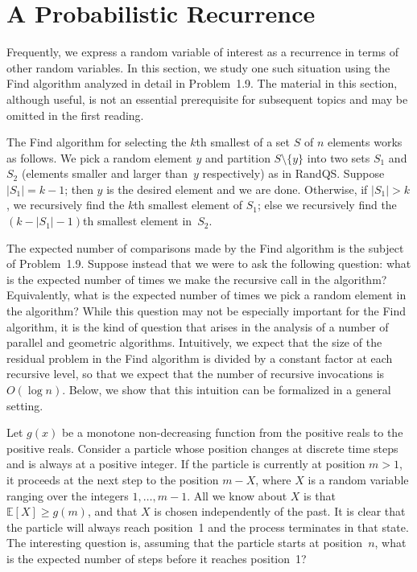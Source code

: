 \documentclass[twoside,12pt]{book}
\theoremstyle{plain}
\theoremstyle{definition}
\theoremstyle{remark}
\begin{document}
\section{A Probabilistic Recurrence}
\label{sec:recurrence}

Frequently, we express a random variable of interest as a recurrence in
terms of other random variables.  In this section, we study one such
situation using the Find algorithm analyzed in detail in Problem~1.9.  The
material in this section, although useful, is not an essential prerequisite
for subsequent topics and may be omitted in the first reading.

The Find algorithm for selecting the $k$th smallest of a set $S$ of $n$
elements works as follows.  We pick a random element $y$ and partition
$S\setminus\{y\}$ into two sets $S_1$ and $S_2$ (elements smaller and larger
than~$y$ respectively) as in RandQS.  Suppose $|S_1|=k-1$; then $y$ is the
desired element and we are done.  Otherwise, if $|S_1|>k$, we recursively
find the $k$th smallest element of $S_1$; else we recursively find the
$(k-|S_1|-1)$th smallest element in~$S_2$.

The expected number of comparisons made by the Find algorithm is the subject
of Problem~1.9.  Suppose instead that we were to ask the following question:
what is the expected number of times we make the recursive call in the
algorithm?  Equivalently, what is the expected number of times we pick a
random element in the algorithm?  While this question may not be especially
important for the Find algorithm, it is the kind of question that arises in
the analysis of a number of parallel and geometric algorithms.  Intuitively,
we expect that the size of the residual problem in the Find algorithm is
divided by a constant factor at each recursive level, so that we expect that
the number of recursive invocations is $O(\log n)$.  Below, we show that
this intuition can be formalized in a general setting.

Let $g(x)$ be a monotone non-decreasing function from the positive reals to
the positive reals.  Consider a particle whose position changes at discrete
time steps and is always at a positive integer.  If the particle is currently
at position $m>1$, it proceeds at the next step to the position $m-X$, where
$X$ is a random variable ranging over the integers $1,\ldots,m-1$.  All we
know about $X$ is that $\mathbb{E}[X]\ge g(m)$, and that $X$ is chosen
independently of the past.  It is clear that the particle will always reach
position~1 and the process terminates in that state.  The interesting
question is, assuming that the particle starts at position~$n$, what is the
expected number of steps before it reaches position~1?
\end{document}
